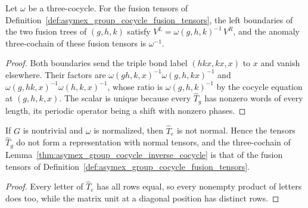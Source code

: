 

\begin{lemma}
    \label{thm:asymex_group_cocycle_inverse_cocycle}
    \leanok
    Let $\omega$ be a three-cocycle. For the fusion tensors of
    Definition~\ref{def:asymex_group_cocycle_fusion_tensors}, the left
    boundaries of the two fusion trees of $(g,h,k)$ satisfy
    $V^L=\omega(g,h,k)^{-1}\,V^R$, and the anomaly three-cochain of these
    fusion tensors is $\omega^{-1}$.
\end{lemma}

\begin{proof}
    \leanok
    Both boundaries send the triple bond label $(hkx,kx,x)$ to $x$ and vanish
    elsewhere. Their factors are
    $\omega(gh,k,x)^{-1}\omega(g,h,kx)^{-1}$ and
    $\omega(g,hk,x)^{-1}\omega(h,k,x)^{-1}$, whose ratio is $\omega(g,h,k)^{-1}$
    by the cocycle equation at $(g,h,k,x)$. The scalar is unique because
    every $\hat T_g$ has nonzero words of every length, its periodic operator
    being a shift with nonzero phases.
\end{proof}

\begin{lemma}
    \label{thm:asymex_group_cocycle_identity_not_normal}
    \leanok
    If $G$ is nontrivial and $\omega$ is normalized, then $\hat T_e$ is not
    normal. Hence the tensors $\hat T_g$ do not form a representation with
    normal tensors, and the three-cochain of
    Lemma~\ref{thm:asymex_group_cocycle_inverse_cocycle} is that of the
    fusion tensors of Definition~\ref{def:asymex_group_cocycle_fusion_tensors}.
\end{lemma}

\begin{proof}
    \leanok
    Every letter of $\hat T_e$ has all rows equal, so every nonempty product
    of letters does too, while the matrix unit at a diagonal position has
    distinct rows.
\end{proof}

